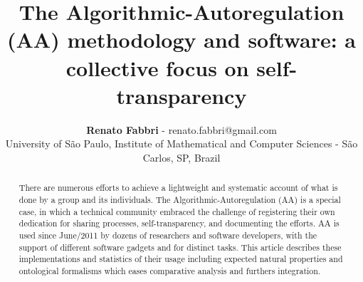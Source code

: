 \documentclass[12pt,fleqn]{article}
\title{The Algorithmic-Autoregulation (AA) methodology and software: a collective focus on self-transparency}
\author
    {\rm \begin{tabular}{l} 
    \textbf{Renato Fabbri}$$ - {\textnormal renato.fabbri@gmail.com}\\%
    {\fontsize{11}{0}\selectfont University of São Paulo, Institute of Mathematical and Computer Sciences - São Carlos, SP, Brazil}\vspace*{-0.05cm} \\
  \end{tabular}}
\renewcommand{\headrulewidth}{0.0pt}
\begin{document}
\maketitle

\thispagestyle{firspagetstyle}

\renewcommand{\headrulewidth}{0.0pt}
\rhead{}

\begin{abstract}
There are numerous efforts to achieve a lightweight and systematic account of what is done by a group and its individuals.
The Algorithmic-Autoregulation (AA) is a special case,
in which a technical community embraced the challenge of registering their own dedication
for sharing processes, self-transparency, and documenting the efforts.
AA is used since June/2011 by dozens of researchers and software developers,
with the support of different software gadgets and for distinct tasks.
This article describes these implementations and statistics of their usage
including expected natural properties and ontological formalisms 
	which eases comparative analysis and furthers integration.
\end{abstract}


\pagestyle{fancy}
\end{document}
